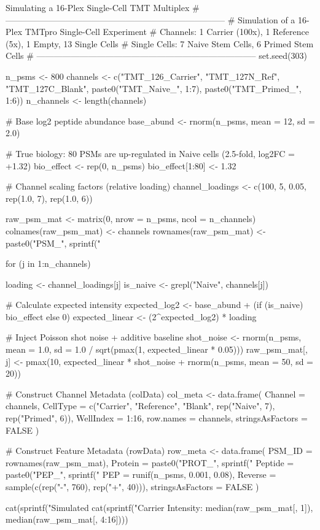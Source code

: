 \documentclass[11pt,twoside,openright]{book}
\begin{document}
\begin{rchunk}{Simulating a 16-Plex Single-Cell TMT Multiplex}
# -----------------------------------------------------------------------------
# Simulation of a 16-Plex TMTpro Single-Cell Experiment
# Channels: 1 Carrier (100x), 1 Reference (5x), 1 Empty, 13 Single Cells
# Single Cells: 7 Naive Stem Cells, 6 Primed Stem Cells
# -----------------------------------------------------------------------------
set.seed(303)

n_psms <- 800
channels <- c("TMT_126_Carrier", "TMT_127N_Ref", "TMT_127C_Blank",
              paste0("TMT_Naive_", 1:7), paste0("TMT_Primed_", 1:6))
n_channels <- length(channels)

# Base log2 peptide abundance
base_abund <- rnorm(n_psms, mean = 12, sd = 2.0)

# True biology: 80 PSMs are up-regulated in Naive cells (2.5-fold, log2FC = +1.32)
bio_effect <- rep(0, n_psms)
bio_effect[1:80] <- 1.32

# Channel scaling factors (relative loading)
channel_loadings <- c(100, 5, 0.05, rep(1.0, 7), rep(1.0, 6))

raw_psm_mat <- matrix(0, nrow = n_psms, ncol = n_channels)
colnames(raw_psm_mat) <- channels
rownames(raw_psm_mat) <- paste0("PSM_", sprintf("%

for (j in 1:n_channels) {
  loading <- channel_loadings[j]
  is_naive <- grepl("Naive", channels[j])
  
  # Calculate expected intensity
  expected_log2 <- base_abund + (if (is_naive) bio_effect else 0)
  expected_linear <- (2^expected_log2) * loading
  
  # Inject Poisson shot noise + additive baseline
  shot_noise <- rnorm(n_psms, mean = 1.0, sd = 1.0 / sqrt(pmax(1, expected_linear * 0.05)))
  raw_psm_mat[, j] <- pmax(10, expected_linear * shot_noise + rnorm(n_psms, mean = 50, sd = 20))
}

# Construct Channel Metadata (colData)
col_meta <- data.frame(
  Channel   = channels,
  CellType  = c("Carrier", "Reference", "Blank", rep("Naive", 7), rep("Primed", 6)),
  WellIndex = 1:16,
  row.names = channels,
  stringsAsFactors = FALSE
)

# Construct Feature Metadata (rowData)
row_meta <- data.frame(
  PSM_ID   = rownames(raw_psm_mat),
  Protein  = paste0("PROT_", sprintf("%
  Peptide  = paste0("PEP_", sprintf("%
  PEP      = runif(n_psms, 0.001, 0.08),
  Reverse  = sample(c(rep("-", 760), rep("+", 40))),
  stringsAsFactors = FALSE
)

cat(sprintf("Simulated %
cat(sprintf("Carrier Intensity: %
            median(raw_psm_mat[, 1]), median(raw_psm_mat[, 4:16])))
\end{rchunk}
\end{document}
